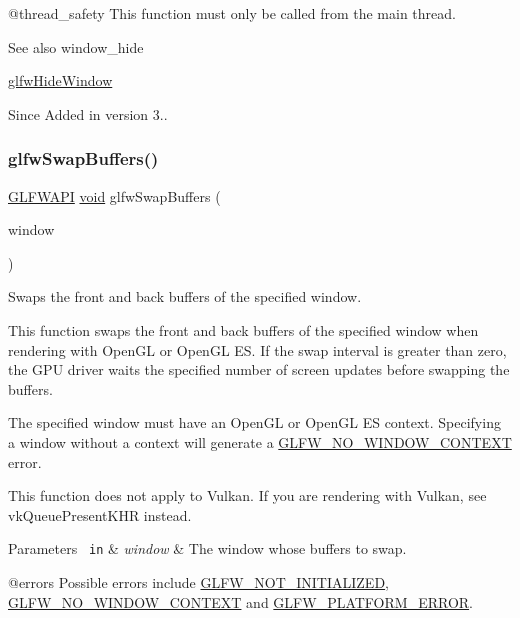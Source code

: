 @thread\+\_\+safety This function must only be called from the main thread.

\begin{DoxySeeAlso}{See also}
window\+\_\+hide 

\mbox{\hyperlink{group__window_gaa17e287d521544bdeceafa09ac036e20}{glfw\+Hide\+Window}}
\end{DoxySeeAlso}
\begin{DoxySince}{Since}
Added in version 3.. 
\end{DoxySince}
\mbox{\label{group__window_gafb827800eedbfcbc97b1e5408df668d7}} 
\subsubsection{\texorpdfstring{glfwSwapBuffers()}{glfwSwapBuffers()}}
{\footnotesize\ttfamily \mbox{\hyperlink{glfw3_8h_a56da5036b2cc259351ae22fd6439bb47}{G\+L\+F\+W\+A\+PI}} \mbox{\hyperlink{glad_8h_a950fc91edb4504f62f1c577bf4727c29}{void}} glfw\+Swap\+Buffers (\begin{DoxyParamCaption}\item[{\mbox{\hyperlink{group__window_ga3c96d80d363e67d13a41b5d1821f3242}{G\+L\+F\+Wwindow}} $\ast$}]{window }\end{DoxyParamCaption})}



Swaps the front and back buffers of the specified window. 

This function swaps the front and back buffers of the specified window when rendering with Open\+GL or Open\+GL ES. If the swap interval is greater than zero, the G\+PU driver waits the specified number of screen updates before swapping the buffers.

The specified window must have an Open\+GL or Open\+GL ES context. Specifying a window without a context will generate a \mbox{\hyperlink{group__errors_gacff24d2757da752ae4c80bf452356487}{G\+L\+F\+W\+\_\+\+N\+O\+\_\+\+W\+I\+N\+D\+O\+W\+\_\+\+C\+O\+N\+T\+E\+XT}} error.

This function does not apply to Vulkan. If you are rendering with Vulkan, see {\ttfamily vk\+Queue\+Present\+K\+HR} instead.


\begin{DoxyParams}[1]{Parameters}
\mbox{\texttt{ in}}  & {\em window} & The window whose buffers to swap.\\
\hline
\end{DoxyParams}
@errors Possible errors include \mbox{\hyperlink{group__errors_ga2374ee02c177f12e1fa76ff3ed15e14a}{G\+L\+F\+W\+\_\+\+N\+O\+T\+\_\+\+I\+N\+I\+T\+I\+A\+L\+I\+Z\+ED}}, \mbox{\hyperlink{group__errors_gacff24d2757da752ae4c80bf452356487}{G\+L\+F\+W\+\_\+\+N\+O\+\_\+\+W\+I\+N\+D\+O\+W\+\_\+\+C\+O\+N\+T\+E\+XT}} and \mbox{\hyperlink{group__errors_gad44162d78100ea5e87cdd38426b8c7a1}{G\+L\+F\+W\+\_\+\+P\+L\+A\+T\+F\+O\+R\+M\+\_\+\+E\+R\+R\+OR}}.

